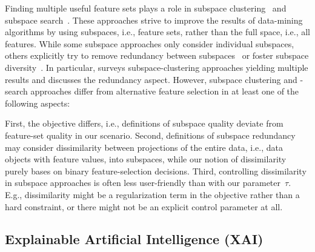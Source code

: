 \documentclass{article}
\theoremstyle{definition}
\begin{document}
Finding multiple useful feature sets plays a role in subspace clustering~\cite{hu2018subspace, mueller2009relevant} and subspace search~\cite{fouche2021efficient, nguyen20134s, trittenbach2019dimension}.
These approaches strive to improve the results of data-mining algorithms by using subspaces, i.e., feature sets, rather than the full space, i.e., all features.
While some subspace approaches only consider individual subspaces, others explicitly try to remove redundancy between subspaces~\cite{mueller2009relevant, nguyen20134s} or foster subspace diversity~\cite{fouche2021efficient, trittenbach2019dimension}.
In particular, \cite{hu2018subspace} surveys subspace-clustering approaches yielding multiple results and discusses the redundancy aspect.
However, subspace clustering and -search approaches differ from alternative feature selection in at least one of the following aspects:

First, the objective differs, i.e., definitions of subspace quality deviate from feature-set quality in our scenario.
Second, definitions of subspace redundancy may consider dissimilarity between projections of the entire data, i.e., data objects with feature values, into subspaces, while our notion of dissimilarity purely bases on binary feature-selection decisions.
Third, controlling dissimilarity in subspace approaches is often less user-friendly than with our parameter~$\tau$.
E.g., dissimilarity might be a regularization term in the objective rather than a hard constraint, or there might not be an explicit control parameter at all.

\subsection{Explainable Artificial Intelligence (XAI)}
\label{sec:afs:related-work:xai}
\end{document}
